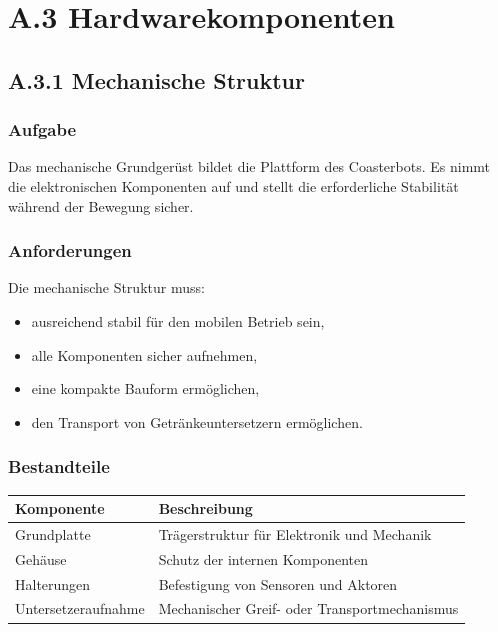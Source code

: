 \documentclass[
]{article}
\providecommand{\tightlist}{%
  \setlength{\itemsep}{0pt}\setlength{\parskip}{0pt}}
\begin{document}
\section{A.3 Hardwarekomponenten}\label{a.3-hardwarekomponenten}

\subsection{A.3.1 Mechanische
Struktur}\label{a.3.1-mechanische-struktur}

\subsubsection{Aufgabe}\label{aufgabe}

Das mechanische Grundgerüst bildet die Plattform des Coasterbots. Es
nimmt die elektronischen Komponenten auf und stellt die erforderliche
Stabilität während der Bewegung sicher.

\subsubsection{Anforderungen}\label{anforderungen}

Die mechanische Struktur muss:

\begin{itemize}
\tightlist
\item
  ausreichend stabil für den mobilen Betrieb sein,
\item
  alle Komponenten sicher aufnehmen,
\item
  eine kompakte Bauform ermöglichen,
\item
  den Transport von Getränkeuntersetzern ermöglichen.
\end{itemize}

\subsubsection{Bestandteile}\label{bestandteile}

\begin{longtable}[]{@{}ll@{}}
\toprule\noalign{}
Komponente & Beschreibung \\
\midrule\noalign{}
\endhead
\bottomrule\noalign{}
\endlastfoot
Grundplatte & Trägerstruktur für Elektronik und Mechanik \\
Gehäuse & Schutz der internen Komponenten \\
Halterungen & Befestigung von Sensoren und Aktoren \\
Untersetzeraufnahme & Mechanischer Greif- oder Transportmechanismus \\
\end{longtable}
\end{document}
